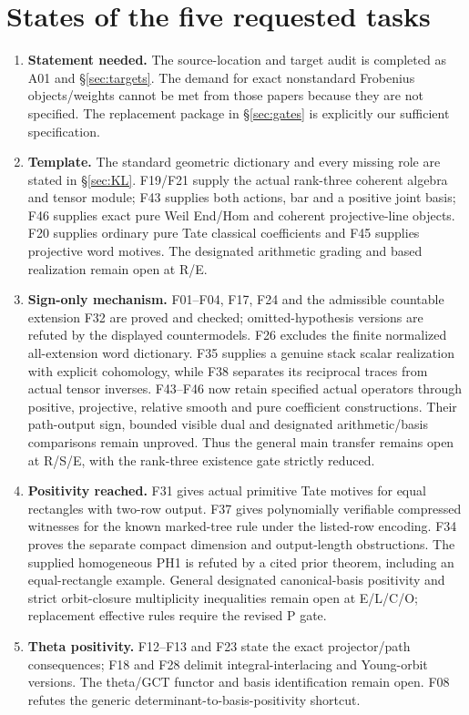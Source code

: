 \section{States of the five requested tasks}
\begin{enumerate}
\item \textbf{Statement needed.} The source-location and target audit is completed as A01 and \S\ref{sec:targets}. The demand for exact nonstandard Frobenius objects/weights cannot be met from those papers because they are not specified. The replacement package in \S\ref{sec:gates} is explicitly our sufficient specification.
\item \textbf{Template.} The standard geometric dictionary and every missing role are stated in \S\ref{sec:KL}. F19/F21 supply the actual rank-three coherent algebra and tensor module; F43 supplies both actions, bar and a positive joint basis; F46 supplies exact pure Weil End/Hom and coherent projective-line objects. F20 supplies ordinary pure Tate classical coefficients and F45 supplies projective word motives. The designated arithmetic grading and based realization remain open at R/E.
\item \textbf{Sign-only mechanism.} F01--F04, F17, F24 and the admissible countable extension F32 are proved and checked; omitted-hypothesis versions are refuted by the displayed countermodels. F26 excludes the finite normalized all-extension word dictionary. F35 supplies a genuine stack scalar realization with explicit cohomology, while F38 separates its reciprocal traces from actual tensor inverses. F43--F46 now retain specified actual operators through positive, projective, relative smooth and pure coefficient constructions. Their path-output sign, bounded visible dual and designated arithmetic/basis comparisons remain unproved. Thus the general main transfer remains open at R/S/E, with the rank-three existence gate strictly reduced.
\item \textbf{Positivity reached.} F31 gives actual primitive Tate motives for equal rectangles with two-row output. F37 gives polynomially verifiable compressed witnesses for the known marked-tree rule under the listed-row encoding. F34 proves the separate compact dimension and output-length obstructions. The supplied homogeneous PH1 is refuted by a cited prior theorem, including an equal-rectangle example. General designated canonical-basis positivity and strict orbit-closure multiplicity inequalities remain open at E/L/C/O; replacement effective rules require the revised P gate.
\item \textbf{Theta positivity.} F12--F13 and F23 state the exact projector/path consequences; F18 and F28 delimit integral-interlacing and Young-orbit versions. The theta/GCT functor and basis identification remain open. F08 refutes the generic determinant-to-basis-positivity shortcut.
\end{enumerate}


